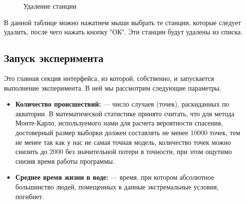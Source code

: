\documentclass{article}
\begin{document}
\begin{itemize}
\begin{figure}[hbt!]
\begin{minipage}[h]{\linewidth}
            \end{minipage}
            \caption{Удаление станции}
        \end{figure}
        В данной таблице можно нажатием мыши выбрать те станции, которые следует удалить, после чего нажать кнопку "ОК". Эти станции будут удалены из списка.
    \end{itemize}

\subsection{Запуск эксперимента} Это главная секция интерфейса, из которой, собственно, и запускается выполнение эксперимента. В ней мы рассмотрим следующие параметры.
    \begin{itemize}
        \item \textbf{Количество происшествий: } --- число случаев (точек), раскиданных по акватории. В математической статистике принято считать, что для метода Монте-Карло, используемого нами для расчета вероятности спасения, достоверный размер выборки должен составлять не менее $10000$ точек, тем не менее так как у нас не самая точная модель, количество точек можно снизить до $2000$ без значительной потери в точности, при этом ощутимо снизив время работы программы. 
        \item \textbf{Среднее время жизни в воде: } --- время, при котором абсолютное большинство людей, помещенных в данные экстремальные условия, погибнет. 
    \end{itemize}
\end{document}
